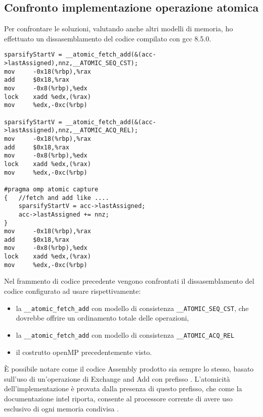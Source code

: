 \subsection{Confronto implementazione operazione atomica}
Per confrontare le soluzioni, valutando anche altri modelli di memoria,
ho effettuato un dissasemblamento del codice compilato con gcc 8.5.0.\\
\begin{lstlisting}[language={[x86masm]Assembler}]
sparsifyStartV = __atomic_fetch_add(&(acc->lastAssigned),nnz,__ATOMIC_SEQ_CST); 
mov		-0x18(%rbp),%rax
add		$0x18,%rax
mov		-0x8(%rbp),%edx
lock 	xadd %edx,(%rax)
mov		%edx,-0xc(%rbp)

sparsifyStartV = __atomic_fetch_add(&(acc->lastAssigned),nnz,__ATOMIC_ACQ_REL); 
mov		-0x18(%rbp),%rax
add		$0x18,%rax
mov		-0x8(%rbp),%edx
lock	xadd %edx,(%rax)
mov		%edx,-0xc(%rbp)

#pragma omp atomic capture
{   //fetch and add like .... 
	sparsifyStartV = acc->lastAssigned;
	acc->lastAssigned += nnz;
}
mov		-0x18(%rbp),%rax
add		$0x18,%rax
mov		-0x8(%rbp),%edx
lock	xadd %edx,(%rax)
mov		%edx,-0xc(%rbp) 
\end{lstlisting}
Nel frammento di codice precedente vengono confrontati il dissasemblamento del codice
configurato ad usare rispettivamente: 
\begin{itemize}
	\item la \verb|__atomic_fetch_add| con modello di consistenza \verb|__ATOMIC_SEQ_CST|, 
	  che dovrebbe offrire un ordinamento totale delle operazioni,
	\item la \verb|__atomic_fetch_add| con modello di consistenza \verb|__ATOMIC_ACQ_REL|
	\item il costrutto openMP  precedentemente visto.\\
\end{itemize}
È possibile notare come il codice Assembly prodotto sia sempre lo stesso,
basato sull'uso di un'operazione di Exchange and Add con prefisso .
L'atomicità dell'implementazione è provata dalla presenza di questo prefisso,
che come la documentazione intel riporta, 
consente al processore corrente di avere uso esclusivo di ogni memoria condivisa \cite{intelDevMan2}.\\


